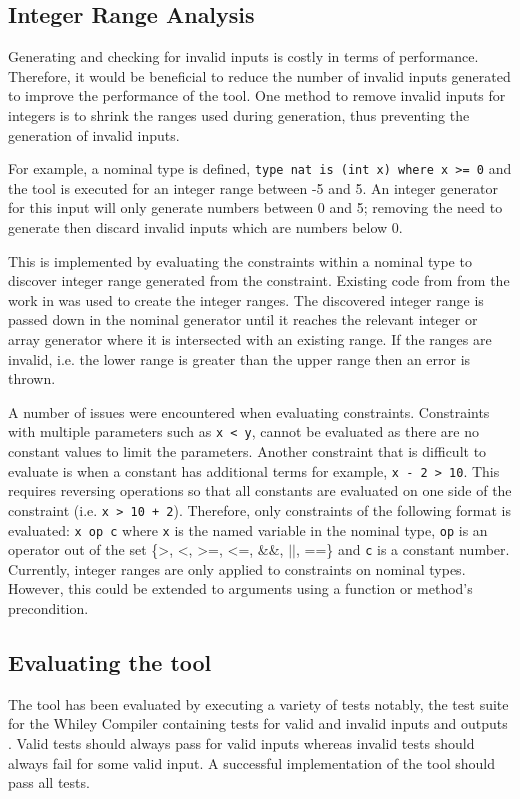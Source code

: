 \subsection{Integer Range Analysis}

Generating and checking for invalid inputs is costly in terms of performance. 
Therefore, it would be beneficial to reduce the number of invalid inputs generated to improve the performance of the tool.
One method to remove invalid inputs for integers is to shrink the ranges used during generation, thus preventing the generation of invalid inputs.

For example, a nominal type is defined, \texttt{type nat is (int x) where x \textgreater= 0} and the tool is executed for an integer range between -5 and 5. An integer generator for this input will only generate numbers between 0 and 5; removing the need to generate then discard invalid inputs which are numbers below 0.

This is implemented by evaluating the constraints within a nominal type to discover integer range generated from the constraint.
Existing code from \cite{whileyIntegerRangeCode} from the work in \cite{whileyIntegerRange} was used to create the integer ranges.
The discovered integer range is passed down in the nominal generator until it reaches the relevant integer or array generator where it is intersected with an existing range.
If the ranges are invalid, i.e. the lower range is greater than the upper range then an error is thrown.

A number of issues were encountered when evaluating constraints.
Constraints with multiple parameters such as \texttt{x < y}, cannot be evaluated as there are no constant values to limit the parameters. 
Another constraint that is difficult to evaluate is when a constant has additional terms for example, \texttt{x - 2 > 10}. 
This requires reversing operations so that all constants are evaluated on one side of the constraint (i.e. \texttt{x > 10 + 2}). 
Therefore, only constraints of the following format is evaluated: \texttt{x op c} where \texttt{x} is the named variable in the nominal type, \texttt{op} is an operator out of the set \{\textgreater, \textless, \textgreater=, \textless=, \&\&, $||$, ==\} and \texttt{c} is a constant number. 
Currently, integer ranges are only applied to constraints on nominal types. 
However, this could be extended to arguments using a function or method's precondition.

\subsection{Evaluating the tool}
\label{subsec:toolEval}
The tool has been evaluated by executing a variety of tests notably, the test suite for the Whiley Compiler containing tests for valid and invalid inputs and outputs \cite{whileyCompilerTests}. 
Valid tests should always pass for valid inputs whereas invalid tests should always fail for some valid input. 
A successful implementation of the tool should pass all tests.

